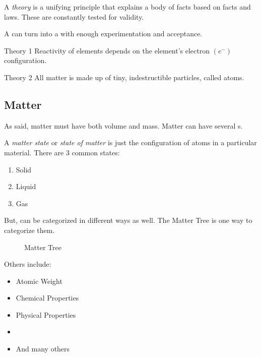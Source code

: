 \begin{definition}[Theory] \label{def:Theory}
  A \emph{theory} is a unifying principle that explains a body of facts based on facts and laws.
  These are constantly tested for validity.
  \begin{remark}
    A  can turn into a  with enough experimentation and acceptance.
  \end{remark}
\end{definition}

\begin{example}[]{Theory 1}
  Reactivity of elements depends on the element's electron $\left( e^{-} \right)$ configuration.
\end{example}

\begin{example}[]{Theory 2}
  All matter is made up of tiny, indestructible particles, called atoms.
\end{example}

\subsection{Matter} \label{subsec:Matter}
As  said, matter must have both volume and mass.
Matter can have several s.

\begin{definition} \label{def:Matter State}
  A \emph{matter state} or \emph{state of matter} is just the configuration of atoms in a particular material.
  There are 3 common states:
  \begin{enumerate}
  \item Solid
  \item Liquid
  \item Gas
  \end{enumerate}
\end{definition}

But,  can be categorized in different ways as well.
The Matter Tree is one way to categorize them.
\begin{figure}[h!]
  
  \caption{Matter Tree}
  \label{fig:Matter Tree}
\end{figure}

Others include:
\begin{itemize}[noitemsep, nolistsep]
  \item Atomic Weight
  \item Chemical Properties
  \item Physical Properties
  \item {}
  \item And many others
\end{itemize}

